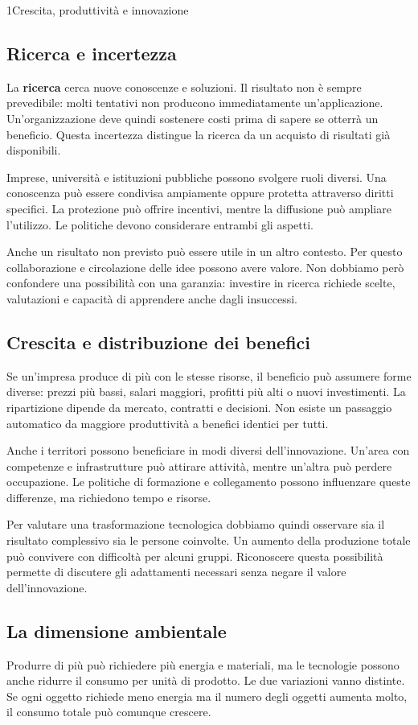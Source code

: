 \begin{lettura}{1}{Crescita, produttività e innovazione}
\subsection*{Ricerca e incertezza}
La \textbf{ricerca} cerca nuove conoscenze e soluzioni. Il risultato non è sempre prevedibile: molti tentativi non producono immediatamente un'applicazione. Un'organizzazione deve quindi sostenere costi prima di sapere se otterrà un beneficio. Questa incertezza distingue la ricerca da un acquisto di risultati già disponibili.

Imprese, università e istituzioni pubbliche possono svolgere ruoli diversi. Una conoscenza può essere condivisa ampiamente oppure protetta attraverso diritti specifici. La protezione può offrire incentivi, mentre la diffusione può ampliare l'utilizzo. Le politiche devono considerare entrambi gli aspetti.

Anche un risultato non previsto può essere utile in un altro contesto. Per questo collaborazione e circolazione delle idee possono avere valore. Non dobbiamo però confondere una possibilità con una garanzia: investire in ricerca richiede scelte, valutazioni e capacità di apprendere anche dagli insuccessi.

\subsection*{Crescita e distribuzione dei benefici}
Se un'impresa produce di più con le stesse risorse, il beneficio può assumere forme diverse: prezzi più bassi, salari maggiori, profitti più alti o nuovi investimenti. La ripartizione dipende da mercato, contratti e decisioni. Non esiste un passaggio automatico da maggiore produttività a benefici identici per tutti.

Anche i territori possono beneficiare in modi diversi dell'innovazione. Un'area con competenze e infrastrutture può attirare attività, mentre un'altra può perdere occupazione. Le politiche di formazione e collegamento possono influenzare queste differenze, ma richiedono tempo e risorse.

Per valutare una trasformazione tecnologica dobbiamo quindi osservare sia il risultato complessivo sia le persone coinvolte. Un aumento della produzione totale può convivere con difficoltà per alcuni gruppi. Riconoscere questa possibilità permette di discutere gli adattamenti necessari senza negare il valore dell'innovazione.

\subsection*{La dimensione ambientale}
Produrre di più può richiedere più energia e materiali, ma le tecnologie possono anche ridurre il consumo per unità di prodotto. Le due variazioni vanno distinte. Se ogni oggetto richiede meno energia ma il numero degli oggetti aumenta molto, il consumo totale può comunque crescere.


\end{lettura}
